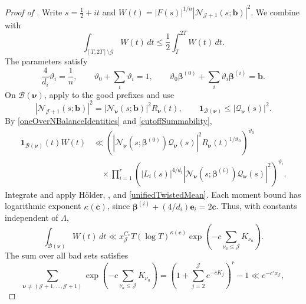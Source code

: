 \documentclass[oneside, 12pt]{amsart}
\theoremstyle{definition}
\begin{document}
{		\begin{proof}[Proof of ]
			Write $s=\tfrac12+it$ and
			$W(t)=|F(s)|^{1/n}|\mathcal N_{\mathscr J+1}(s;\boldsymbol b)|^2$.
			We combine  with
			\begin{equation}\label{oneOverNComplementTarget}
				\int_{[T,2T]\setminus\mathscr G}W(t)\,dt
				\leq\frac12\int_T^{2T}W(t)\,dt.
			\end{equation}
			The parameters satisfy
			\begin{equation}\label{oneOverNBalanceIdentities}
				\frac4{d_i}\vartheta_i=\frac1n,\qquad
				\vartheta_0+\sum_i\vartheta_i=1,\qquad
				\vartheta_0\boldsymbol\beta^{(0)}
				+\sum_i\vartheta_i\boldsymbol\beta^{(i)}=\boldsymbol b.
			\end{equation}
			On $\mathscr B(\boldsymbol\nu)$, apply
			 to the good prefixes and use
			\[
			|\mathcal N_{\mathscr J+1}(s;\boldsymbol b)|^2
			=|\mathcal N_{\boldsymbol\nu}(s;\boldsymbol b)|^2R_{\boldsymbol\nu}(t),
			\qquad
			\mathbf1_{\mathscr B(\boldsymbol\nu)}\leq|\mathcal Q_{\boldsymbol\nu}(s)|^2.
			\]
			By \eqref{oneOverNBalanceIdentities} and \eqref{cutoffSummability},
			\begin{align}
				\mathbf1_{\mathscr B(\boldsymbol\nu)}(t)W(t)
				&\ll
				\left(
				|\mathcal N_{\boldsymbol\nu}(s;\boldsymbol\beta^{(0)})
				\mathcal Q_{\boldsymbol\nu}(s)|^2
				R_{\boldsymbol\nu}(t)^{1/\vartheta_0}
				\right)^{\vartheta_0}\nonumber\\
				&\quad\times\prod_{i=1}^r
				\left(
				|L_i(s)|^{4/d_i}
				|\mathcal N_{\boldsymbol\nu}(s;\boldsymbol\beta^{(i)})
				\mathcal Q_{\boldsymbol\nu}(s)|^2
				\right)^{\vartheta_i}.
				\label{oneOverNBadSetPointwise}
			\end{align}
			Integrate and apply H\"older, , and
			\eqref{unifiedTwistedMean}.  Each moment bound has logarithmic exponent
			$\kappa(\boldsymbol c)$, since
			$\boldsymbol\beta^{(i)}+(4/d_i)\boldsymbol e_i=2\boldsymbol c$.
			Thus, with constants independent of $\Lambda$,
			\[
			\int_{\mathscr B(\boldsymbol\nu)}W(t)\,dt
			\ll x_{\mathscr J}^{C_*}T(\log T)^{\kappa(\boldsymbol c)}
			\exp\left(-c\sum_{\nu_a\leq\mathscr J}K_{\nu_a}\right).
			\]
			The sum over all bad sets satisfies
			\[
			\sum_{\boldsymbol\nu\ne(\mathscr J+1,\ldots,\mathscr J+1)}
			\exp\left(-c\sum_{\nu_a\leq\mathscr J}K_{\nu_a}\right)
			=\left(1+\sum_{j=2}^{\mathscr J}e^{-cK_j}\right)^r-1
			\ll e^{-c'x_{\mathscr J}},
			\]

\end{proof}}
\end{document}
